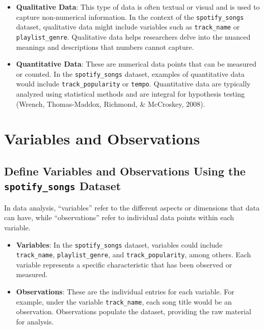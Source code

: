 \documentclass[
  b5paper]{book}
\begin{document}
\begin{itemize}
\item
  \textbf{Qualitative Data}: This type of data is often textual or visual and is used to capture non-numerical information. In the context of the \texttt{spotify\_songs} dataset, qualitative data might include variables such as \texttt{track\_name} or \texttt{playlist\_genre}. Qualitative data helps researchers delve into the nuanced meanings and descriptions that numbers cannot capture.
\item
  \textbf{Quantitative Data}: These are numerical data points that can be measured or counted. In the \texttt{spotify\_songs} dataset, examples of quantitative data would include \texttt{track\_popularity} or \texttt{tempo}. Quantitative data are typically analyzed using statistical methods and are integral for hypothesis testing (Wrench, Thomas-Maddox, Richmond, \& McCroskey, 2008).
\end{itemize}

\hypertarget{variables-and-observations}{%
\section{Variables and Observations}\label{variables-and-observations}}

\hypertarget{define-variables-and-observations-using-the-spotify_songs-dataset}{%
\subsection{\texorpdfstring{Define Variables and Observations Using the \texttt{spotify\_songs} Dataset}{Define Variables and Observations Using the spotify\_songs Dataset}}\label{define-variables-and-observations-using-the-spotify_songs-dataset}}

In data analysis, ``variables'' refer to the different aspects or dimensions that data can have, while ``observations'' refer to individual data points within each variable.

\begin{itemize}
\item
  \textbf{Variables}: In the \texttt{spotify\_songs} dataset, variables could include \texttt{track\_name}, \texttt{playlist\_genre}, and \texttt{track\_popularity}, among others. Each variable represents a specific characteristic that has been observed or measured.
\item
  \textbf{Observations}: These are the individual entries for each variable. For example, under the variable \texttt{track\_name}, each song title would be an observation. Observations populate the dataset, providing the raw material for analysis.
\end{itemize}
\end{document}
